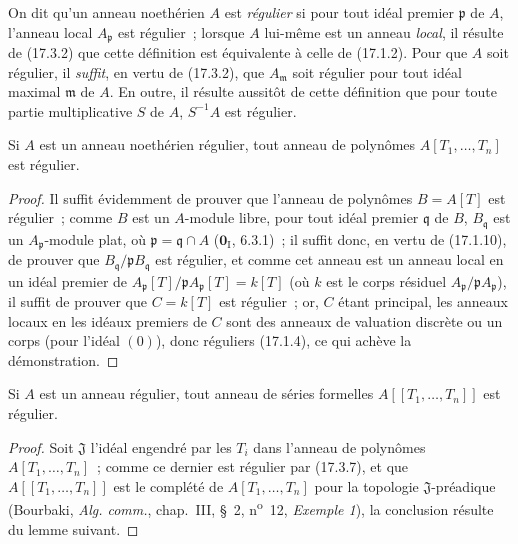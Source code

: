 \begin{env}[17.3.6]
\label{0.17.3.6-fr}
On dit qu'un anneau noethérien $A$ est \emph{régulier} si pour tout idéal
premier $\mathfrak{p}$ de $A$, l'anneau local $A_{\mathfrak{p}}$ est
régulier~; lorsque $A$ lui-même est un anneau \emph{local}, il résulte de (17.3.2)
que cette définition est équivalente à celle de (17.1.2). Pour que $A$ soit
régulier, il \emph{suffit}, en vertu de (17.3.2), que $A_{\mathfrak{m}}$ soit
régulier pour tout idéal maximal $\mathfrak{m}$ de $A$. En outre, il résulte
aussitôt de cette définition que pour toute partie multiplicative $S$ de
$A$, $S^{-1}A$ est régulier.
\end{env}

\begin{proposition}[17.3.7]
\label{0.17.3.7-fr}
Si $A$ est un anneau noethérien régulier, tout anneau de polynômes
$A[T_1,\ldots,T_n]$ est régulier.
\end{proposition}

\begin{proof}
Il suffit évidemment de prouver que l'anneau de polynômes $B=A[T]$ est
régulier~; comme $B$ est un $A$-module libre, pour tout idéal premier
$\mathfrak{q}$ de $B$, $B_{\mathfrak{q}}$ est un
$A_{\mathfrak{p}}$-module plat, où $\mathfrak{p}=\mathfrak{q}\cap A$
($\mathbf{0}_{\mathrm I}$, 6.3.1)~; il suffit donc, en vertu de (17.1.10), de prouver
que $B_{\mathfrak{q}}/\mathfrak{p}B_{\mathfrak{q}}$ est régulier, et comme
cet anneau est un anneau local en un idéal premier de
$A_{\mathfrak{p}}[T]/\mathfrak{p}A_{\mathfrak{p}}[T]=k[T]$ (où $k$ est le
corps résiduel $A_{\mathfrak{p}}/\mathfrak{p}A_{\mathfrak{p}}$), il suffit
de prouver que $C=k[T]$ est régulier~; or, $C$ étant principal, les anneaux
locaux en les idéaux premiers de $C$ sont des anneaux de valuation discrète
ou un corps (pour l'idéal $(0)$), donc réguliers (17.1.4), ce qui achève la
démonstration.
\end{proof}

\begin{corollary}[17.3.8]
\label{0.17.3.8-fr}
Si $A$ est un anneau régulier, tout anneau de séries formelles
$A[[T_1,\ldots,T_n]]$ est régulier.
\end{corollary}

\begin{proof}
Soit $\mathfrak{J}$ l'idéal engendré par les $T_i$ dans l'anneau de polynômes
$A[T_1,\ldots,T_n]$~; comme ce dernier est régulier par (17.3.7), et que
$A[[T_1,\ldots,T_n]]$ est le complété de $A[T_1,\ldots,T_n]$ pour la
topologie $\mathfrak{J}$-préadique (Bourbaki, \emph{Alg. comm.}, chap.~III,
\S~2, n\textsuperscript{o}~12, \emph{Exemple 1}), la conclusion résulte du lemme suivant.
\end{proof}

